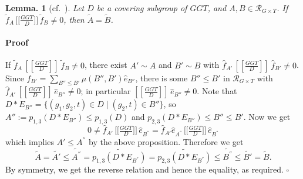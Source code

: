 \documentclass[12pt]{article}
\theoremstyle{change}
\newtheorem{lem}[theorem]{Lemma.}
\newenvironment{proof}{\paragraph{Proof}}{\hfill$\square$}
\renewcommand{\le}{\leqslant} %
\newcommand{\calR}{\mathcal{R}}
\newcommand{\1}{{\bf 1}}
\begin{document}
\begin{lem}[cf.\ {\cite[Lemma 6.3]{BC}}]
\label{lem: f-orthogonality}
Let $D$ be a covering subgroup of $GGT$, and $A,B\in\calR_{G\times T}$.
If $\widetilde{f}_A\,\Big[\Big[\tfrac{GGT}{D}\Big]\Big]\,\widetilde{f}_B\neq 0$, then $\widetilde{A}=\widetilde{B}$.
\end{lem}
\begin{proof}
If $\widetilde{f}_A\,[[\tfrac{GGT}{D}]]\,\widetilde{f}_B\neq 0$, there exist $A'\sim A$ and
$B'\sim B$ with $\widehat{f}_{A'}\,[[\tfrac{GGT}{D}]]\,\widehat{f}_{B'}\neq 0$. Since
$\widehat{f}_{B'}=\sum_{B''\le B'}\mu(B'',B')\widehat{e}_{B''}$, there is some
$B''\le B'$ in $\calR_{G\times T}$ with
$\widehat{f}_{A'}\,[[\tfrac{GGT}{D}]]\,\widehat{e}_{B''}\neq 0$; in particular
$[[\tfrac{GGT}{D}]]\,\widehat{e}_{B''}\neq 0$. Note that
$D\ast E_{B''}=\{(g_1,g_2,t)\in D\mid (g_2,t)\in B''\}$, so
$A'':=p_{1,3}(D\ast E_{B''})\le p_{1,3}(D)$ and
$p_{2,3}(D\ast E_{B''})\le B''\le B'$.
Now we get  
\[
0 \neq \widehat{f}_{A'}\,\Big[\Big[\tfrac{GGT}{D}\Big]\Big]\,\widehat{e}_{B^{''}} = \widehat{f}_{A'}\widehat{e}_{A^{''}}\,\Big[\Big[\tfrac{GGT}{D}\Big]\Big]\,\widehat{e}_{B^{''}}
\]
which implies $A'\le A^{''}$ by the above proposition. Therefore we get
\[
\widetilde{A} = \widetilde{A'} \le \widetilde{A^{''}} = \widetilde{p_{1,3}(D\ast E_{B^{''}})}= \widetilde{p_{2,3}(D\ast E_{B^{''}})}\le \widetilde{B^{''}}\le \widetilde{B'} = \widetilde{B}.
\]
By symmetry, we get the reverse relation and hence the equality, as required.
\end{proof}
\end{document}
